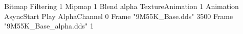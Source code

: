 {Bitmap
  {Filtering 1}
  {Mipmap 1}
  {Blend alpha}
  {TextureAnimation 1}
  {Animation AsyncStart Play}
  {AlphaChannel 0}
  {Frame "9M55K_Base.dds" 3500}
  {Frame "9M55K_Base_alpha.dds" 1}
}
